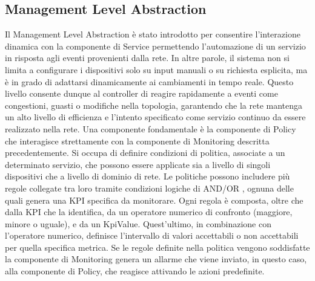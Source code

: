 \subsection{Management Level Abstraction}
Il Management Level Abstraction è stato introdotto per consentire l'interazione dinamica con la componente di Service permettendo l'automazione di un servizio in risposta agli eventi provenienti dalla rete.
In altre parole, il sistema non si limita a configurare i dispositivi solo su input manuali o su richiesta esplicita, ma è in grado di adattarsi dinamicamente ai cambiamenti in tempo reale. 
Questo livello consente dunque al controller di reagire rapidamente a eventi come congestioni, guasti o modifiche nella topologia, garantendo che la rete mantenga un alto livello di efficienza e l'intento
specificato come servizio continuo da essere realizzato nella rete. 
\newline Una componente fondamentale è la componente di Policy che interagisce strettamente con la componente di Monitoring descritta precedentemente.
\newline Si occupa di definire condizioni di politica, associate a un determinato servizio, che possono essere applicate sia a livello di singoli dispositivi che a livello di dominio di rete.
Le politiche possono includere più regole collegate tra loro tramite condizioni logiche di AND/OR \cite{D32}, ognuna delle quali genera una KPI specifica da monitorare.
\newline Ogni regola è composta, oltre che dalla KPI che la identifica, da un operatore numerico di confronto (maggiore, minore o uguale), e da un KpiValue.
Quest'ultimo, in combinazione con l'operatore numerico, definisce l'intervallo di valori accettabili o non accettabili per quella specifica metrica.
\newline Se le regole definite nella politica vengono soddisfatte la componente di Monitoring genera un allarme che viene inviato, in questo caso, alla componente di Policy, che reagisce attivando le azioni predefinite.
